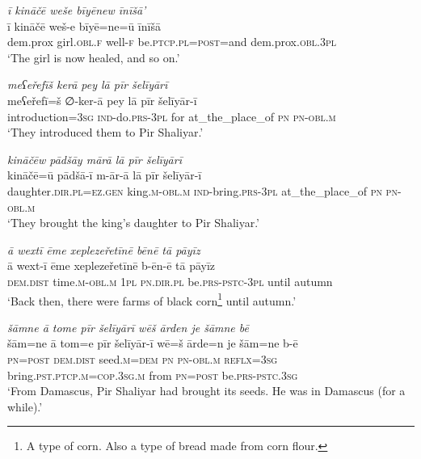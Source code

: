 \ea \label{ZP.91}
\textit{ī kināčē weše bīyēnew īnīšā’} \\ 
\gll ī kināčē weš-e bīyē=ne=ū īnīšā \\ 
 dem.prox girl\textsc{.obl}\textsc{.f} well\textsc{-f} be\textsc{.ptcp}\textsc{.pl}\textsc{=\textsc{post}}=and dem.prox\textsc{.obl}\textsc{.3pl} \\ 
\glt `The girl is now healed, and so on.'
\z 
 
\ea \label{ZP.92}
\textit{meʕeřefīš kerā pey lā pīr šelīyārī} \\ 
\gll meʕeřefī=š ∅-ker-ā pey lā pīr šelīyār-ī \\ 
 introduction\textsc{=3sg} \textsc{ind-}do\textsc{.prs}\textsc{-3pl} for at\_the\_place\_of \textsc{pn} \textsc{pn}\textsc{-obl}\textsc{.m} \\ 
\glt `They introduced them to Pir Shaliyar.'
\z 
 
\ea \label{ZP.93}
\textit{kināčēw pādšāy mārā lā pīr šelīyārī} \\ 
\gll kināčē=ū pādšā-ī m-ār-ā lā pīr šelīyār-ī \\ 
 daughter\textsc{.dir}\textsc{.pl}\textsc{\textsc{=ez.gen}} king\textsc{.m}\textsc{-obl}\textsc{.m} \textsc{ind-}bring\textsc{.prs}\textsc{-3pl} at\_the\_place\_of \textsc{pn} \textsc{pn}\textsc{-obl}\textsc{.m} \\ 
\glt `They brought the king’s daughter to Pir Shaliyar.'
\z 
 
\ea \label{ZP.94}
\textit{ā wextī ēme xeplezeřetīnē bēnē tā pāyīz} \\ 
\gll ā wext-ī ēme xeplezeřetīnē b-ēn-ē tā pāyīz \\ 
 \textsc{dem.dist} time\textsc{.m}\textsc{-obl}\textsc{.m} \textsc{1pl} \textsc{pn}\textsc{.dir}\textsc{.pl} be\textsc{.prs}\textsc{-pstc}\textsc{-3pl} until autumn \\ 
\glt `Back then, there were farms of black corn\footnote{A type of corn. Also a type of bread made from corn flour.} until autumn.'
\z 
 
\ea \label{ZP.95}
\textit{šāmne ā tome pīr šelīyārī wēš ārden je šāmne bē} \\ 
\gll šām=ne ā tom=e pīr šelīyār-ī wē=š ārde=n je šām=ne b-ē \\ 
 \textsc{pn}\textsc{=\textsc{post}} \textsc{dem.dist} seed\textsc{.m}\textsc{=dem} \textsc{pn} \textsc{pn}\textsc{-obl}\textsc{.m} \textsc{reflx}\textsc{=3sg} bring\textsc{.pst}\textsc{.ptcp}\textsc{.m}\textsc{=cop}\textsc{.3sg}\textsc{.m} from \textsc{pn}\textsc{=\textsc{post}} be\textsc{.prs}\textsc{-pstc}\textsc{.3sg} \\ 
\glt `From Damascus, Pir Shaliyar had brought its seeds. He was in Damascus (for a while).'
\z 
 
